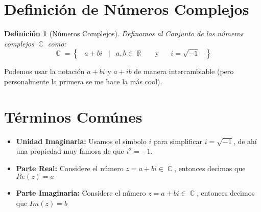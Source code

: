 \documentclass[12pt, fleqn]{report}                             %
\DeclareMathOperator \Space {\quad}                             %
\DeclareMathOperator \MiniSpace {\;}                            %
\newcommand \Such {\MiniSpace|\MiniSpace}                       %
\newcommand \Also {\Space \text{y} \Space}                      %
\newtheorem{Definition}{Definición}[section]                    %
\newcommand{\Set}[1]{\left\{ \MiniSpace #1 \MiniSpace \right\}} %
\DeclareMathOperator \Reals     {\mathbb{R}}                     %
\DeclareMathOperator \Complexs  {\mathbb{C}}                     %
\begin{document}
        \clearpage
        \section{Definición de Números Complejos}

            \begin{Definition}[Números Complejos]
            \label{NumerosComplejos}
                Definamos al Conjunto de los números complejos $\Complexs$ como:
                \begin{equation}
                    \Complexs = 
                        \Set{ a + bi \Such a,b \in \Reals \Also i = \sqrt{-1} }
                \end{equation}

            \end{Definition}


            Podemos usar la notación $a+bi$ y $a+ib$ de manera intercambiable (pero personalmente 
            la primera se me hace la más cool).


        \section{Términos Comúnes} 

            \begin{itemize}
                \item \textbf{Unidad Imaginaria:}
                    Usamos el símbolo $i$ para simplificar $i = \sqrt{-1}$, de ahí una propiedad
                    muy famosa de que $i^2 = -1$.

                \item \textbf{Parte Real:}
                    Considere el número $z = a+bi \in \Complexs$, entonces decimos que $Re(z) = a$

                \item \textbf{Parte Imaginaria:}
                    Considere el número $z = a+bi \in \Complexs$, entonces decimos que $Im(z) = b$
            \end{itemize}



\end{document}
